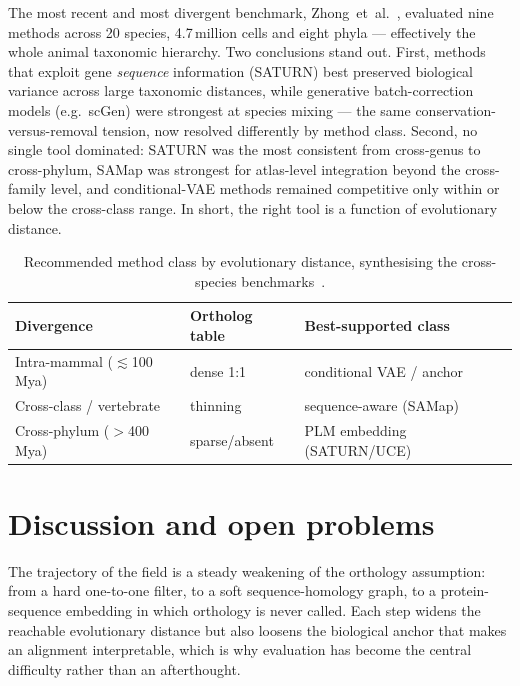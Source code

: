 \documentclass[10pt,twocolumn]{article}
\begin{document}
The most recent and most divergent benchmark, Zhong~et~al.~\cite{zhong2025},
evaluated nine methods across 20 species, 4.7\,million cells and eight phyla ---
effectively the whole animal taxonomic hierarchy. Two conclusions stand out. First,
methods that exploit gene \emph{sequence} information (SATURN) best preserved
biological variance across large taxonomic distances, while generative
batch-correction models (e.g.\ scGen) were strongest at species mixing --- the same
conservation-versus-removal tension, now resolved differently by method class.
Second, no single tool dominated: SATURN was the most consistent from cross-genus to
cross-phylum, SAMap was strongest for atlas-level integration beyond the cross-family
level, and conditional-VAE methods remained competitive only within or below the
cross-class range. In short, the right tool is a function of evolutionary distance.

\begin{table}[t]
\centering
\small
\caption{Recommended method class by evolutionary distance, synthesising the
cross-species benchmarks~\cite{song2023,zhong2025}.}
\label{tab:reco}
\begin{tabular}{@{}p{2.55cm}p{2.0cm}p{2.5cm}@{}}
\toprule
\textbf{Divergence} & \textbf{Ortholog table} & \textbf{Best-supported class} \\
\midrule
Intra-mammal ($\lesssim$100\,Mya) & dense 1:1 & conditional VAE / anchor \\
Cross-class / vertebrate & thinning & sequence-aware (SAMap) \\
Cross-phylum ($>$400\,Mya) & sparse/absent & PLM embedding (SATURN/UCE) \\
\bottomrule
\end{tabular}
\end{table}

\section{Discussion and open problems}
The trajectory of the field is a steady weakening of the orthology assumption: from a
hard one-to-one filter, to a soft sequence-homology graph, to a protein-sequence
embedding in which orthology is never called. Each step widens the reachable
evolutionary distance but also loosens the biological anchor that makes an alignment
interpretable, which is why evaluation has become the central difficulty rather than
an afterthought.
\end{document}
